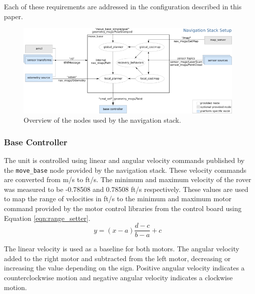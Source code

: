 \documentclass{article}
\begin{document}
          Each of these requirements are addressed in the configuration described in this paper.
          \begin{figure}[h]
               \centering
               \includegraphics[scale=0.5]{images/nav_stack_overview}
               \caption[Overview of the Navigation Stack Setup]{Overview of the nodes used by the navigation stack.}
               \label{fig:nav-stack-overview}
          \end{figure}
          \subsubsection{Base Controller}
          The unit is controlled using linear and angular velocity commands published by the \verb|move_base| node provided by the navigation stack. These velocity commands are converted from m/s to ft/s. The minimum and maximum velocity of the rover was measured to be -0.78508 and 0.78508 ft/s respectively. These values are used to map the range of velocities in ft/s to the minimum and maximum motor command provided by the motor control libraries from the control board \cite{pololu} using Equation \ref{eqn:range_setter}.
          \begin{equation}
            y = (x-a)\frac{d-c}{b-a}+c
          \label{eqn:range_setter}
          \end{equation}
          \par The linear velocity is used as a baseline for both motors. The angular velocity added to the right motor and subtracted from the left motor, decreasing or increasing the value depending on the sign. Positive angular velocity indicates a counterclockwise motion and negative angular velocity indicates a clockwise motion.
\end{document}
